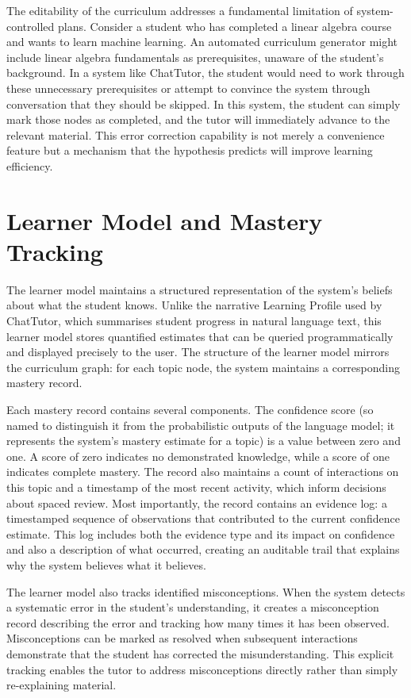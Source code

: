 \documentclass[logo,bsc,singlespacing,parskip,online]{infthesis}
\begin{document}
The editability of the curriculum addresses a fundamental limitation of system-controlled plans. Consider a student who has completed a linear algebra course and wants to learn machine learning. An automated curriculum generator might include linear algebra fundamentals as prerequisites, unaware of the student's background. In a system like ChatTutor, the student would need to work through these unnecessary prerequisites or attempt to convince the system through conversation that they should be skipped. In this system, the student can simply mark those nodes as completed, and the tutor will immediately advance to the relevant material. This error correction capability is not merely a convenience feature but a mechanism that the hypothesis predicts will improve learning efficiency.

\section{Learner Model and Mastery Tracking}

The learner model maintains a structured representation of the system's beliefs about what the student knows. Unlike the narrative Learning Profile used by ChatTutor, which summarises student progress in natural language text, this learner model stores quantified estimates that can be queried programmatically and displayed precisely to the user. The structure of the learner model mirrors the curriculum graph: for each topic node, the system maintains a corresponding mastery record.

Each mastery record contains several components. The confidence score (so named to distinguish it from the probabilistic outputs of the language model; it represents the system's mastery estimate for a topic) is a value between zero and one. A score of zero indicates no demonstrated knowledge, while a score of one indicates complete mastery. The record also maintains a count of interactions on this topic and a timestamp of the most recent activity, which inform decisions about spaced review. Most importantly, the record contains an evidence log: a timestamped sequence of observations that contributed to the current confidence estimate. This log includes both the evidence type and its impact on confidence and also a description of what occurred, creating an auditable trail that explains why the system believes what it believes.

The learner model also tracks identified misconceptions. When the system detects a systematic error in the student's understanding, it creates a misconception record describing the error and tracking how many times it has been observed. Misconceptions can be marked as resolved when subsequent interactions demonstrate that the student has corrected the misunderstanding. This explicit tracking enables the tutor to address misconceptions directly rather than simply re-explaining material.
\end{document}
